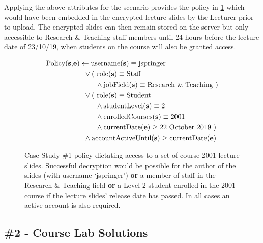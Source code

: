 Applying the above attributes for the scenario provides the policy in \cref{fig:case_study_policy_1} which would have been embedded in the encrypted lecture slides by the Lecturer prior to upload. The encrypted slides can then remain stored on the server but only accessible to Research \& Teaching staff members until 24 hours before the lecture date of 23/10/19, when students on the course will also be granted access.

\begin{figure}[ht]
  \centering
\begin{align*}
  \text{Policy(\textbf{s},\textbf{e})}
  &
    \leftarrow
    \text{username(\textbf{s})} \equiv \text{jspringer}
  \\
  &
    \phantom{::}\vee
    \text{( role(\textbf{s})} \equiv \text{Staff}
  \\
  &
    \phantom{::::::::}\wedge
    \text{jobField(\textbf{s})} \equiv \text{Research \& Teaching )}
  \\
  &
    \phantom{::}\vee
    \text{( role(\textbf{s})} \equiv \text{Student}
  \\
  &
    \phantom{::::::::}\wedge
    \text{studentLevel(\textbf{s})} \equiv \text{2}
  \\
  &
    \phantom{::::::::}\wedge
    \text{enrolledCourses(\textbf{s})} \equiv \text{2001}
  \\
  &
    \phantom{::::::::}\wedge
    \text{currentDate(\textbf{e})} \geq \text{22 October 2019 )}
  \\
  &
    \phantom{::}\wedge
    \text{accountActiveUntil(\textbf{s})} \geq \text{currentDate(\textbf{e})}
\end{align*}
  \caption{
    \label{fig:case_study_policy_1}
    Case Study \#1 policy dictating access to a set of course 2001 lecture slides.
    Successful decryption would be possible for the author of the slides (with username `jspringer') \textbf{or} a member of staff in the Research \& Teaching field \textbf{or} a Level 2 student enrolled in the 2001 course if the lecture slides' release date has passed. In all cases an active account is also required.
  }
\end{figure}

\subsection{\#2 - Course Lab Solutions}
\label{subsec:analysis_case_studies_2}

